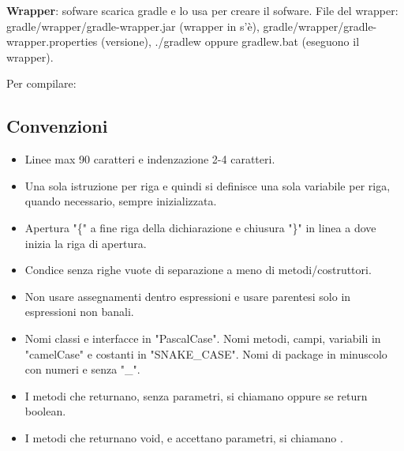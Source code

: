\textbf{Wrapper}: sofware scarica gradle e lo usa per creare il sofware.
File del wrapper: gradle/wrapper/gradle-wrapper.jar (wrapper in s'è), gradle/wrapper/gradle-wrapper.properties (versione), ./gradlew oppure gradlew.bat (eseguono il wrapper).

Per compilare:



\subsection{Convenzioni}
\begin{itemize}
	\item Linee max 90 caratteri e indenzazione 2-4 caratteri.
	\item Una sola istruzione per riga e quindi si definisce una sola variabile per riga, quando necessario, sempre inizializzata.
	\item Apertura "\{" a fine riga della dichiarazione e chiusura "\}" in linea a dove inizia la riga di apertura.
	\item Condice senza righe vuote di separazione a meno di metodi/costruttori.
	\item Non usare assegnamenti dentro espressioni e usare parentesi solo in espressioni non banali.
	\item Nomi classi e interfacce in "PascalCase". Nomi metodi, campi, variabili in "camelCase" e costanti in "SNAKE\_CASE". Nomi di package in minuscolo con numeri e senza "\_".
	\bigskip
	\item I metodi che returnano, senza parametri, si chiamano  oppure  se return boolean.
	\item I metodi che returnano void, e accettano parametri, si chiamano .
\end{itemize}